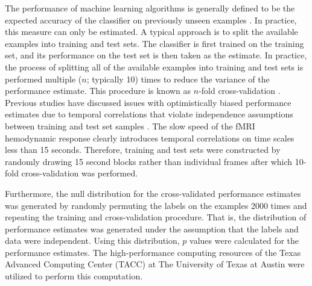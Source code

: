 \documentclass[5p,authoryear]{elsarticle}
\begin{document}
The performance of machine learning algorithms is generally defined to be the expected accuracy of the classifier on previously unseen examples \citep{Bishop2006}.
In practice, this measure can only be estimated.
A typical approach is to split the available examples into training and test sets.
The classifier is first trained on the training set, and its performance on the test set is then taken as the estimate.
In practice, the process of splitting all of the available examples into training and test sets is performed multiple ($n$; typically 10) times to reduce the variance of the performance estimate.
This procedure is known as $n$-fold cross-validation \citep{Kohavi1995}.
Previous studies have discussed issues with optimistically biased performance estimates due to temporal correlations that violate independence assumptions between training and test set samples \citep{Pereira2009}. 
The slow speed of the fMRI hemodynamic response clearly introduces temporal correlations on time scales less than 15 seconds.
Therefore, training and test sets were constructed by randomly drawing 15 second blocks rather than individual frames after which 10-fold cross-validation was performed.

Furthermore, the null distribution for the cross-validated performance estimates was generated by randomly permuting the labels on the examples 2000 times and repeating the training and cross-validation procedure.
That is, the distribution of performance estimates was generated under the assumption that the labels and data were independent.
Using this distribution, $p$ values were calculated for the performance estimates.
The high-performance computing resources of the Texas Advanced Computing Center (TACC) at The University of Texas at Austin were utilized to perform this computation.

\end{document}
